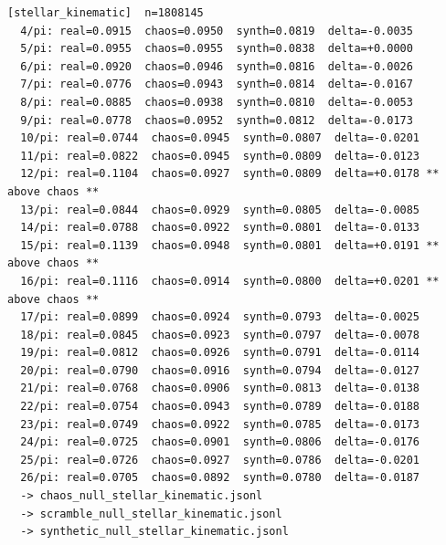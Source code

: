 \documentclass[11pt, letterpaper, openany]{book}
\begin{document}
\begin{empiricalbox}
\begin{lstlisting}[style=terminal]
[stellar_kinematic]  n=1808145
  4/pi: real=0.0915  chaos=0.0950  synth=0.0819  delta=-0.0035
  5/pi: real=0.0955  chaos=0.0955  synth=0.0838  delta=+0.0000
  6/pi: real=0.0920  chaos=0.0946  synth=0.0816  delta=-0.0026
  7/pi: real=0.0776  chaos=0.0943  synth=0.0814  delta=-0.0167
  8/pi: real=0.0885  chaos=0.0938  synth=0.0810  delta=-0.0053
  9/pi: real=0.0778  chaos=0.0952  synth=0.0812  delta=-0.0173
  10/pi: real=0.0744  chaos=0.0945  synth=0.0807  delta=-0.0201
  11/pi: real=0.0822  chaos=0.0945  synth=0.0809  delta=-0.0123
  12/pi: real=0.1104  chaos=0.0927  synth=0.0809  delta=+0.0178 ** above chaos **
  13/pi: real=0.0844  chaos=0.0929  synth=0.0805  delta=-0.0085
  14/pi: real=0.0788  chaos=0.0922  synth=0.0801  delta=-0.0133
  15/pi: real=0.1139  chaos=0.0948  synth=0.0801  delta=+0.0191 ** above chaos **
  16/pi: real=0.1116  chaos=0.0914  synth=0.0800  delta=+0.0201 ** above chaos **
  17/pi: real=0.0899  chaos=0.0924  synth=0.0793  delta=-0.0025
  18/pi: real=0.0845  chaos=0.0923  synth=0.0797  delta=-0.0078
  19/pi: real=0.0812  chaos=0.0926  synth=0.0791  delta=-0.0114
  20/pi: real=0.0790  chaos=0.0916  synth=0.0794  delta=-0.0127
  21/pi: real=0.0768  chaos=0.0906  synth=0.0813  delta=-0.0138
  22/pi: real=0.0754  chaos=0.0943  synth=0.0789  delta=-0.0188
  23/pi: real=0.0749  chaos=0.0922  synth=0.0785  delta=-0.0173
  24/pi: real=0.0725  chaos=0.0901  synth=0.0806  delta=-0.0176
  25/pi: real=0.0726  chaos=0.0927  synth=0.0786  delta=-0.0201
  26/pi: real=0.0705  chaos=0.0892  synth=0.0780  delta=-0.0187
  -> chaos_null_stellar_kinematic.jsonl
  -> scramble_null_stellar_kinematic.jsonl
  -> synthetic_null_stellar_kinematic.jsonl


\end{lstlisting}
\end{empiricalbox}
\end{document}
